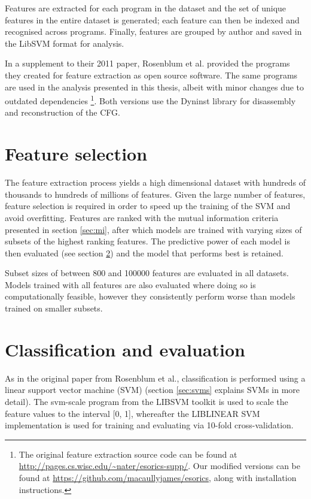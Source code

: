 \documentclass[a4paper,11pt]{kth-mag}
\begin{document}
Features are extracted for each program in the dataset and the set of unique
features in the entire dataset is generated; each feature can then be indexed
and recognised across programs. Finally, features are grouped by author and
saved in the LibSVM format \parencite{chang2011libsvm}
for analysis. 

In a supplement to their 2011 paper, Rosenblum et al. provided the programs
they created for feature extraction as open source software. The same programs
are used in the analysis presented in this thesis, albeit with minor changes
due to outdated dependencies \footnote{
    The original feature extraction source code can be found at
    \url{http://pages.cs.wisc.edu/~nater/esorics-supp/}. Our modified versions
    can be found at \url{https://github.com/macaullyjames/esorics}, along with
    installation instructions.
}. Both versions use the Dyninst library \parencite{sourcedyninst} for disassembly and
reconstruction of the CFG.

\section{Feature selection}
The feature extraction process yields a high dimensional dataset with hundreds
of thousands to hundreds of millions of features. Given the large number of
features, feature selection is required in order to speed up the training of
the SVM and avoid overfitting. Features are ranked with the mutual information
criteria presented in section \ref{sec:mi}, after which models are trained with
varying sizes of subsets of the highest ranking features. The predictive power
of each model is then evaluated (see section \ref{sec:c-e}) and the model that
performs best is retained.

Subset sizes of between 800 and 100000 features are evaluated in all datasets.
Models trained with all features are also evaluated where doing so is
computationally feasible, however they consistently perform worse than models
trained on smaller subsets.

\section{Classification and evaluation}
\label{sec:c-e}
As in the original paper from Rosenblum et al., classification is performed
using a linear support vector machine (SVM) (section \ref{sec:svms} explains
SVMs in more detail). The svm-scale program from the LIBSVM toolkit is used
\parencite{chang2011libsvm} to scale the feature values to the interval [0, 1],
whereafter the LIBLINEAR SVM implementation \parencite{fan2008liblinear} is
used for training and evaluating via 10-fold cross-validation.
\end{document}
